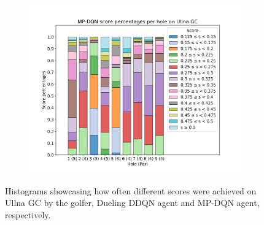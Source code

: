 \documentclass{kththesis}
\begin{document}
\begin{figure}
\begin{subfigure}{\textwidth}
    \end{subfigure}
    \begin{subfigure}{\textwidth}
    \centering
    \includegraphics[height=0.3\textheight]{AgentPercentages/MPDQN_Score_Percentages_Ullna.png} 
    \end{subfigure}
    \caption{Histograms showcasing how often different scores were achieved on Ullna GC by the golfer, Dueling DDQN agent and MP-DQN agent, respectively.}
    \label{fig:ullna_score_histograms}
\end{figure}
\end{document}
